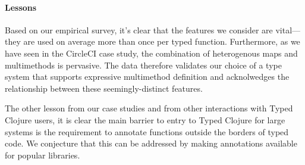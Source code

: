 \paragraph{Lessons}
Based on our empirical survey, it's clear that the features we
consider are vital---they are used on average more than once per typed
function. Furthermore, as we have seen in the CircleCI case study, the
combination of heterogenous maps and multimethods is pervasive. The
data therefore validates our choice of a type system that supports
expressive multimethod definition and acknolwedges the relationship
between these seemingly-distinct features. 

The other lesson from our case studies and from other interactions
with Typed Clojure users, it is clear the main barrier to entry to
Typed Clojure for large systems is the requirement to annotate
functions outside the borders of typed code.  We conjecture that this
can be addressed by making annotations available for popular
libraries.



